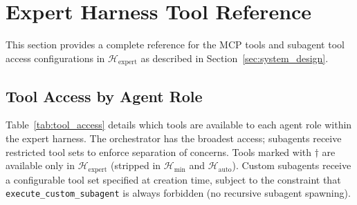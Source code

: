 \section{Expert Harness Tool Reference}\label{sec:appendix_tools}

This section provides a complete reference for the MCP tools and subagent tool access configurations in $\mathcal{H}_{\text{expert}}$ as described in Section~\ref{sec:system_design}.

\subsection{Tool Access by Agent Role}\label{sec:appendix_tool_access}

Table~\ref{tab:tool_access} details which tools are available to each agent role within the expert harness. The orchestrator has the broadest access; subagents receive restricted tool sets to enforce separation of concerns. Tools marked with $\dagger$ are available only in $\mathcal{H}_{\text{expert}}$ (stripped in $\mathcal{H}_{\min}$ and $\mathcal{H}_{\text{auto}}$). Custom subagents receive a configurable tool set specified at creation time, subject to the constraint that \texttt{execute\_custom\_subagent} is always forbidden (no recursive subagent spawning).


